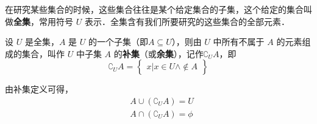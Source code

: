 在研究某些集合的时候，这些集合往往是某个给定集合的子集，这个给定的集合叫做\textbf{全集}，常用符号 $U$ 表示．全集含有我们所要研究的这些集合的全部元素．

设 $U$ 是全集，$A$ 是 $U$ 的一个子集（即$A\subseteq U$），则由 $U$ 中所有不属于 $A$ 的元素组成的集合，叫作 $U$ 中子集 $A$ 的\textbf{补集}（或\textbf{余集}），记作$\complement_UA$，即
\begin{equation}
\complement_UA = \begin{Bmatrix}x|x\in U \wedge \notin A\end{Bmatrix}
\end{equation}

由补集定义可得，
\begin{equation}
\begin{aligned}
&A\cup (\complement_UA) = U \\
&A\cap (\complement_UA) = \phi
\end{aligned}
\end{equation}
